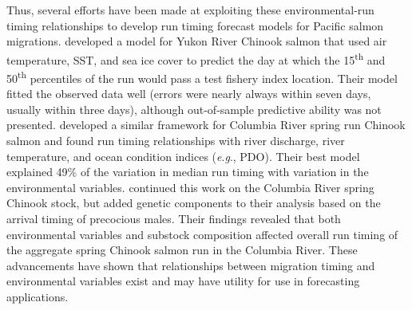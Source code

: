 \documentclass[12pt,]{book}
\theoremstyle{definition}
\theoremstyle{definition}
\theoremstyle{definition}
\theoremstyle{remark}
\begin{document}
Thus, several efforts have been made at exploiting these
environmental-run timing relationships to develop run timing forecast
models for Pacific salmon migrations. \citet{mundy-evenson-2011}
developed a model for Yukon River Chinook salmon that used air
temperature, SST, and sea ice cover to predict the day at which the
15\textsuperscript{th} and 50\textsuperscript{th} percentiles of the run
would pass a test fishery index location. Their model fitted the
observed data well (errors were nearly always within seven days, usually
within three days), although out-of-sample predictive ability was not
presented. \citet{keefer-etal-2008} developed a similar framework for
Columbia River spring run Chinook salmon and found run timing
relationships with river discharge, river temperature, and ocean
condition indices (\emph{e}.\emph{g}., PDO). Their best model explained
49\% of the variation in median run timing with variation in the
environmental variables. \citet{anderson-beer-2009} continued this work
on the Columbia River spring Chinook stock, but added genetic components
to their analysis based on the arrival timing of precocious males. Their
findings revealed that both environmental variables and substock
composition affected overall run timing of the aggregate spring Chinook
salmon run in the Columbia River. These advancements have shown that
relationships between migration timing and environmental variables exist
and may have utility for use in forecasting applications.
\end{document}

